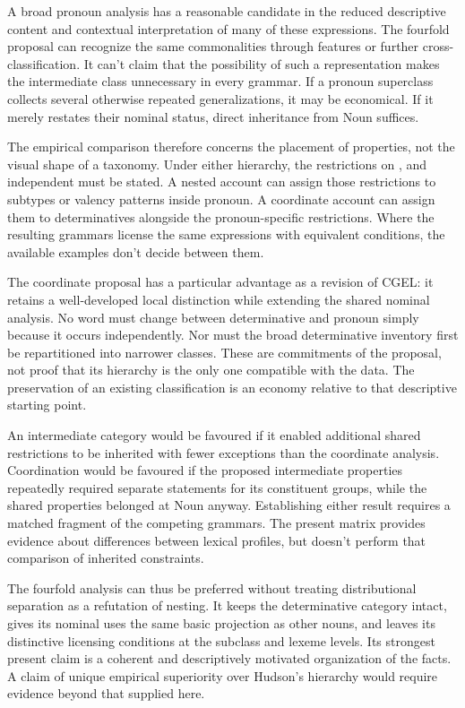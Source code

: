 \documentclass[12pt]{article}
\begin{document}
A broad pronoun analysis has a reasonable candidate in the reduced descriptive content and contextual interpretation of many of these expressions. The fourfold proposal can recognize the same commonalities through features or further cross-classification. It can't claim that the possibility of such a representation makes the intermediate class unnecessary in every grammar. If a pronoun superclass collects several otherwise repeated generalizations, it may be economical. If it merely restates their nominal status, direct inheritance from Noun suffices.

The empirical comparison therefore concerns the placement of properties, not the visual shape of a taxonomy. Under either hierarchy, the restrictions on ,  and independent  must be stated. A nested account can assign those restrictions to subtypes or valency patterns inside pronoun. A coordinate account can assign them to determinatives alongside the pronoun-specific restrictions. Where the resulting grammars license the same expressions with equivalent conditions, the available examples don't decide between them.

The coordinate proposal has a particular advantage as a revision of CGEL: it retains a well-developed local distinction while extending the shared nominal analysis. No word must change between determinative and pronoun simply because it occurs independently. Nor must the broad determinative inventory first be repartitioned into narrower classes. These are commitments of the proposal, not proof that its hierarchy is the only one compatible with the data. The preservation of an existing classification is an economy relative to that descriptive starting point.

An intermediate category would be favoured if it enabled additional shared restrictions to be inherited with fewer exceptions than the coordinate analysis. Coordination would be favoured if the proposed intermediate properties repeatedly required separate statements for its constituent groups, while the shared properties belonged at Noun anyway. Establishing either result requires a matched fragment of the competing grammars. The present matrix provides evidence about differences between lexical profiles, but doesn't perform that comparison of inherited constraints.

The fourfold analysis can thus be preferred without treating distributional separation as a refutation of nesting. It keeps the determinative category intact, gives its nominal uses the same basic projection as other nouns, and leaves its distinctive licensing conditions at the subclass and lexeme levels. Its strongest present claim is a coherent and descriptively motivated organization of the facts. A claim of unique empirical superiority over Hudson's hierarchy would require evidence beyond that supplied here.
\end{document}
